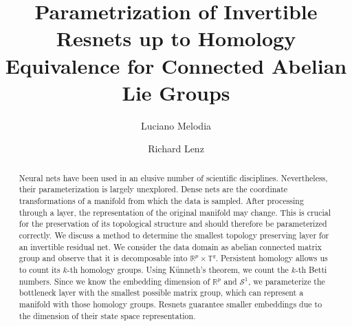 \documentclass[envcountsect,runningheads]{llncs}
\begin{document}
%
\title{Parametrization of Invertible Resnets up to Homology Equivalence for Connected Abelian Lie Groups}
%
%
\author{Luciano Melodia \\
\and Richard Lenz}
%
%
%
\maketitle              %
%
\begin{abstract}
Neural nets have been used in an elusive number of scientific disciplines. Nevertheless, their parameterization is largely unexplored. Dense nets are the coordinate transformations of a manifold from which the data is sampled. After processing through a layer, the representation of the original manifold may change. This is crucial for the preservation of its topological structure and should therefore be parameterized correctly. We discuss a method to determine the smallest topology preserving layer for an invertible residual net. We consider the data domain as abelian connected matrix group and observe that it is decomposable into $\mathbb{R}^p \times \mathbb {T}^q$. Persistent homology allows us to count its $k$-th homology groups. Using Künneth's theorem, we count the $k$-th Betti numbers. Since we know the embedding dimension of $\mathbb{R}^p$ and $\mathcal{S}^1$, we parameterize the bottleneck layer with the smallest possible matrix group, which can represent a manifold with those homology groups. Resnets guarantee smaller embeddings due to the dimension of their state space representation.

\end{abstract}
\end{document}
